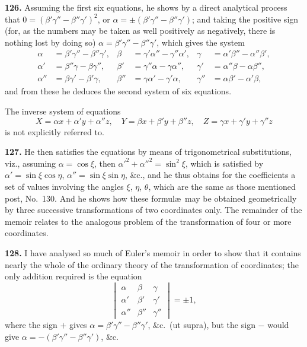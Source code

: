 \documentclass[11pt,a4paper]{book}
\begin{document}
\textbf{126.} Assuming the first six equations, he shows by a direct analytical process that $0 = (\beta'\gamma'' - \beta''\gamma')^2$, or $\alpha = \pm(\beta'\gamma'' - \beta''\gamma')$; and taking the positive sign (for, as the numbers may be taken as well positively as negatively, there is nothing lost by doing so) $\alpha = \beta'\gamma'' - \beta''\gamma'$, which gives the system
\begin{align*}
\alpha &= \beta'\gamma'' - \beta''\gamma', & \beta &= \gamma'\alpha'' - \gamma''\alpha', & \gamma &= \alpha'\beta'' - \alpha''\beta', \\
\alpha' &= \beta''\gamma - \beta\gamma'', & \beta' &= \gamma''\alpha - \gamma\alpha'', & \gamma' &= \alpha''\beta - \alpha\beta'', \\
\alpha'' &= \beta\gamma' - \beta'\gamma, & \beta'' &= \gamma\alpha' - \gamma'\alpha, & \gamma'' &= \alpha\beta' - \alpha'\beta,
\end{align*}
and from these he deduces the second system of six equations.

The inverse system of equations
\[
X = \alpha x + \alpha' y + \alpha'' z, \quad Y = \beta x + \beta' y + \beta'' z, \quad Z = \gamma x + \gamma' y + \gamma'' z
\]
is not explicitly referred to.

\textbf{127.} He then satisfies the equations by means of trigonometrical substitutions, viz., assuming $\alpha = \cos\xi$, then $\alpha'^2 + \alpha''^2 = \sin^2\xi$, which is satisfied by $\alpha' = \sin\xi\cos\eta$, $\alpha'' = \sin\xi\sin\eta$, \&c., and he thus obtains for the coefficients a set of values involving the angles $\xi$, $\eta$, $\theta$, which are the same as those mentioned post, No.~130. And he shows how these formul\ae\ may be obtained geometrically by three successive transformations of two coordinates only. The remainder of the memoir relates to the analogous problem of the transformation of four or more coordinates.

\textbf{128.} I have analysed so much of Euler's memoir in order to show that it contains nearly the whole of the ordinary theory of the transformation of coordinates; the only addition required is the equation
\[
\begin{vmatrix}
\alpha & \beta & \gamma \\
\alpha' & \beta' & \gamma' \\
\alpha'' & \beta'' & \gamma''
\end{vmatrix} = \pm 1,
\]
where the sign $+$ gives $\alpha = \beta'\gamma'' - \beta''\gamma'$, \&c.\ (ut supra), but the sign $-$ would give $\alpha = -(\beta'\gamma'' - \beta''\gamma')$, \&c.
\end{document}
